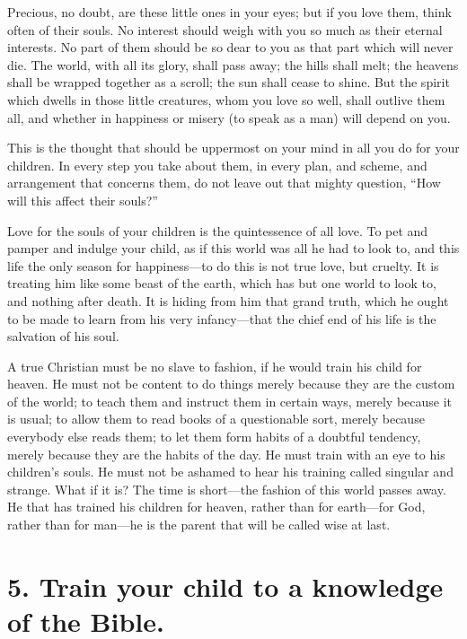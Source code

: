 \documentclass[
]{book}
\begin{document}
Precious, no doubt, are these little ones in your eyes; but if you love them, think often of their souls. No interest should weigh with you so much as their eternal interests. No part of them should be so dear to you as that part which will never die. The world, with all its glory, shall pass away; the hills shall melt; the heavens shall be wrapped together as a scroll; the sun shall cease to shine. But the spirit which dwells in those little creatures, whom you love so well, shall outlive them all, and whether in happiness or misery (to speak as a man) will depend on you.

This is the thought that should be uppermost on your mind in all you do for your children. In every step you take about them, in every plan, and scheme, and arrangement that concerns them, do not leave out that mighty question, ``How will this affect their souls?''

Love for the souls of your children is the quintessence of all love. To pet and pamper and indulge your child, as if this world was all he had to look to, and this life the only season for happiness---to do this is not true love, but cruelty. It is treating him like some beast of the earth, which has but one world to look to, and nothing after death. It is hiding from him that grand truth, which he ought to be made to learn from his very infancy---that the chief end of his life is the salvation of his soul.

A true Christian must be no slave to fashion, if he would train his child for heaven. He must not be content to do things merely because they are the custom of the world; to teach them and instruct them in certain ways, merely because it is usual; to allow them to read books of a questionable sort, merely because everybody else reads them; to let them form habits of a doubtful tendency, merely because they are the habits of the day. He must train with an eye to his children's souls. He must not be ashamed to hear his training called singular and strange. What if it is? The time is short---the fashion of this world passes away. He that has trained his children for heaven, rather than for earth---for God, rather than for man---he is the parent that will be called wise at last.

\hypertarget{train-your-child-to-a-knowledge-of-the-bible.}{%
\section*{5. Train your child to a knowledge of the Bible.}\label{train-your-child-to-a-knowledge-of-the-bible.}}
\end{document}
